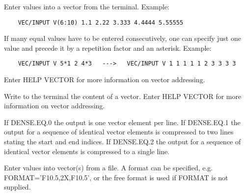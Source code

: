 \ENDCMD


\BEGARG
{}
\ENDARG

   \par
Enter values into a vector from the terminal.  Example:  
\begin{verbatim}
    VEC/INPUT V(6:10) 1.1 2.22 3.333 4.4444 5.55555
\end{verbatim}
   \par
If many equal values have to be entered consecutively, one can specify just 
   one value and precede it by a repetition factor and an asterisk. Example:  
\begin{verbatim}
    VEC/INPUT V 5*1 2 4*3   --->   VEC/INPUT V 1 1 1 1 1 2 3 3 3 3
\end{verbatim}
   \par
Enter HELP VECTOR for more information on vector addressing.  

\ENDCMD


\BEGARG
{}
\ENDARG

   \par
Write to the terminal the content of a vector.  Enter HELP VECTOR for more 
   information on vector addressing.  

   \par
If DENSE.EQ.0 the output is one vector element per line.  If DENSE.EQ.1 the 
   output for a sequence of identical vector elements is compressed to two 
   lines stating the start and end indices.  If DENSE.EQ.2 the output for a 
   sequence of identical vector elements is compressed to a single line.  

\ENDCMD


\BEGARG
{}
\ENDARG
{}
\DEFOPT{\EMPTY}{}
\ENDOPT

   \par
Enter values into vector(s) from a file.  A format can be specified, e.g. 
   FORMAT='F10.5,2X,F10.5', or the free format is used if FORMAT is not 
   supplied.  

